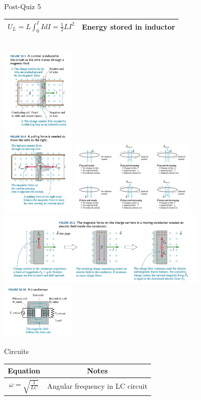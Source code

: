 \documentclass{article}
\begin{document}
\begin{center}
\begin{section}{Post-Quiz 5}
\begin{tabular}{|c|c|}
		 $U_L = L \int_0^I I dI = \frac{1}{2} L I^2$                                   & Energy stored in inductor                                \\
		 \hline
	 \end{tabular}
	 \\
	 \includegraphics[width=100pt]{final_cheet_sheet_resources/wdvrjkvxydvnmzcxxmvblfduelscmiva.jpg}
	 \includegraphics[height=100pt]{final_cheet_sheet_resources/vudruzxbemysxjzyoaltoysmligfugzr.jpg}
	 \includegraphics[height=100pt]{final_cheet_sheet_resources/zqygyosdcfxstmovemujxntoqndcyvgs.jpg}
	 \includegraphics[width=100pt]{final_cheet_sheet_resources/tuicoixlhjdxpxepfpdegieiomxwrgca.jpg}
	 \\
	\end{section}
	\begin{section}{Circuits}
	 \begin{tabular}{|c|c|}
		 \hline
		 Equation                                                                       & Notes                                             \\
		 \hline
		 $\omega = \sqrt{\frac{1}{LC}}$                                                 & Angular frequency in LC circuit                   \\


\end{tabular}
\end{section}
\end{center}
\end{document}
